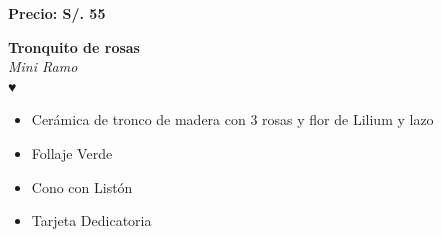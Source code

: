 \documentclass{article}
\begin{document}
\vspace{0.3cm}
\begin{center}
   \textbf{\Large Precio: \textcolor{cpred}{S/. 55 }}
\end{center}
\vspace{1cm}
\noindent
\begin{minipage}{0.6\textwidth}
    \textcolor{cpred}{\textbf{\huge Tronquito de rosas }}\\
    {\textit{Mini Ramo}} \\
    \textcolor{cpred}{\Huge ♥} \\
    \vspace{0.5cm}
    \begin{itemize}
        \item Cerámica de tronco de madera con 3 rosas y flor de Lilium y lazo
        \item Follaje Verde
        \item Cono con Listón
        \item Tarjeta Dedicatoria
    \end{itemize}
\end{minipage}
\hspace{1cm}
\end{document}

